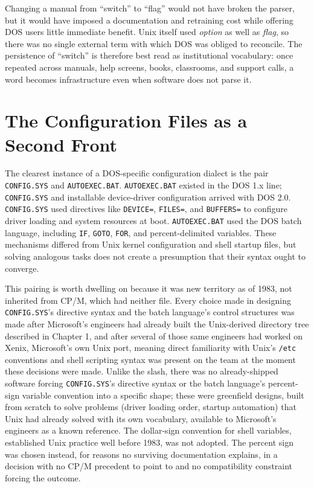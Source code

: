 \documentclass[11pt]{book}
\begin{document}
Changing a manual from ``switch'' to ``flag'' would not have broken the parser, but it would have imposed a documentation and retraining cost while offering DOS users little immediate benefit. Unix itself used \emph{option} as well as \emph{flag}, so there was no single external term with which DOS was obliged to reconcile. The persistence of ``switch'' is therefore best read as institutional vocabulary: once repeated across manuals, help screens, books, classrooms, and support calls, a word becomes infrastructure even when software does not parse it.

\section{The Configuration Files as a Second Front}

The clearest instance of a DOS-specific configuration dialect is the pair \texttt{CONFIG.SYS} and \texttt{AUTOEXEC.BAT}. \texttt{AUTOEXEC.BAT} existed in the DOS 1.x line; \texttt{CONFIG.SYS} and installable device-driver configuration arrived with DOS 2.0. \texttt{CONFIG.SYS} used directives like \texttt{DEVICE=}, \texttt{FILES=}, and \texttt{BUFFERS=} to configure driver loading and system resources at boot. \texttt{AUTOEXEC.BAT} used the DOS batch language, including \texttt{IF}, \texttt{GOTO}, \texttt{FOR}, and percent-delimited variables. These mechanisms differed from Unix kernel configuration and shell startup files, but solving analogous tasks does not create a presumption that their syntax ought to converge.

This pairing is worth dwelling on because it was new territory as of 1983, not inherited from CP/M, which had neither file. Every choice made in designing \texttt{CONFIG.SYS}'s directive syntax and the batch language's control structures was made after Microsoft's engineers had already built the Unix-derived directory tree described in Chapter 1, and after several of those same engineers had worked on Xenix, Microsoft's own Unix port, meaning direct familiarity with Unix's \texttt{/etc} conventions and shell scripting syntax was present on the team at the moment these decisions were made. Unlike the slash, there was no already-shipped software forcing \texttt{CONFIG.SYS}'s directive syntax or the batch language's percent-sign variable convention into a specific shape; these were greenfield designs, built from scratch to solve problems (driver loading order, startup automation) that Unix had already solved with its own vocabulary, available to Microsoft's engineers as a known reference. The dollar-sign convention for shell variables, established Unix practice well before 1983, was not adopted. The percent sign was chosen instead, for reasons no surviving documentation explains, in a decision with no CP/M precedent to point to and no compatibility constraint forcing the outcome.
\end{document}

